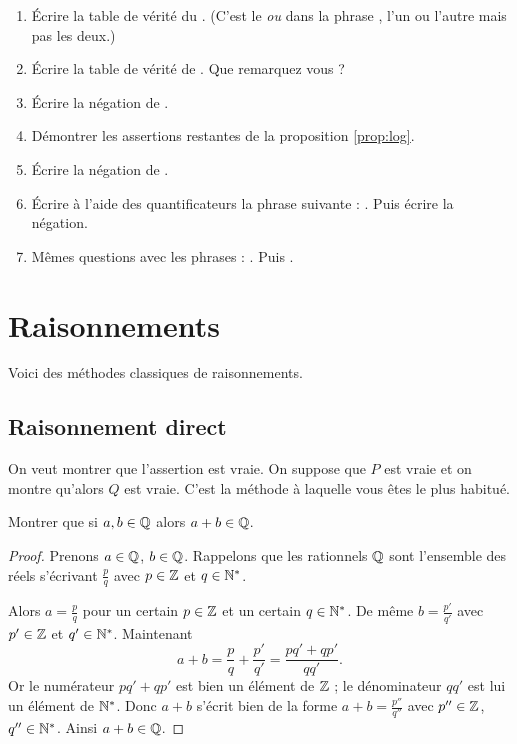 \documentclass[11pt,class=report,crop=false]{standalone}
\begin{document}
\begin{miniexercices}
\sauteligne
\begin{enumerate}
  \item \'Ecrire la table de vérité du . (C'est le \emph{ou} dans la phrase
, l'un ou l'autre mais pas les deux.)
  \item \'Ecrire la table de vérité de . Que remarquez vous ?
  \item \'Ecrire la négation de .
  \item Démontrer les assertions restantes de la proposition \ref{prop:log}.
  \item \'Ecrire la négation de .
  \item \'Ecrire à l'aide des quantificateurs la phrase suivante :
.  Puis écrire la négation.
  \item Mêmes questions avec les phrases : . Puis
.
\end{enumerate}
\end{miniexercices}




\section{Raisonnements}

Voici des méthodes classiques de raisonnements.

\subsection{Raisonnement direct}
On veut montrer que l'assertion  est vraie.
On suppose que $P$ est vraie et on montre qu'alors $Q$ est vraie.
C'est la méthode à laquelle vous êtes le plus habitué.

\begin{exemple}
Montrer que si $a,b \in \mathbb{Q}$ alors $a+b\in \mathbb{Q}$.

\begin{proof}
Prenons $a\in \mathbb{Q}$, $b\in \mathbb{Q}$.
Rappelons que les rationnels $\mathbb{Q}$ sont
l’ensemble des réels s'écrivant $\frac{p}{q}$ avec $p\in\mathbb{Z}$ et $q\in \mathbb{N}^*$.

Alors $a = \frac{p}{q}$
pour un certain $p \in \mathbb{Z}$ et un certain $q\in \mathbb{N}^*$. De même $b = \frac{p'}{q'}$
avec $p' \in \mathbb{Z}$ et $q'\in \mathbb{N}^*$.
Maintenant
$$a+b= \frac{p}{q} + \frac{p'}{q'} = \frac{pq'+qp'}{qq'}.$$
Or le numérateur $pq'+qp'$ est bien un élément de $\mathbb{Z}$ ;
le dénominateur $qq'$ est lui un élément de $\mathbb{N}^*$. Donc
$a+b$ s'écrit bien de la forme $a+b=\frac{p''}{q''}$ avec $p''\in \mathbb{Z}$,
$q''\in \mathbb{N}^*$. Ainsi $a+b \in \mathbb{Q}$.
\end{proof}
\end{exemple}
\end{document}
